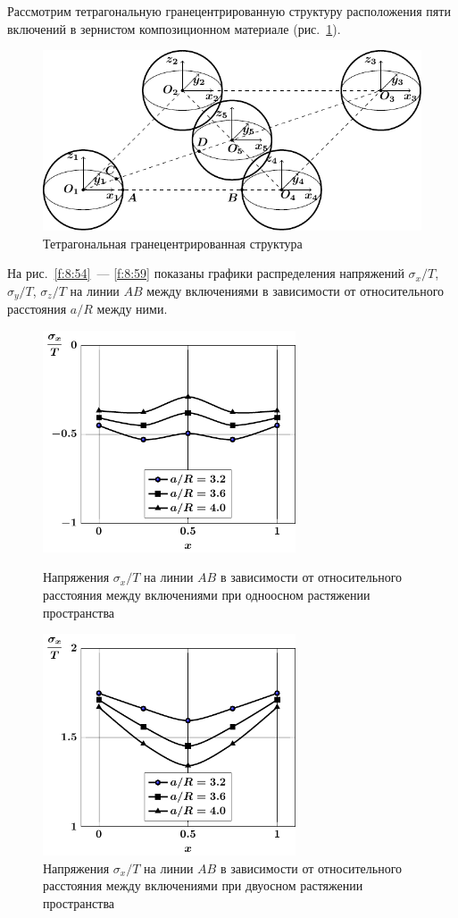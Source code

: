 Рассмотрим тетрагональную гранецентрированную структуру расположения пяти включений в зернистом композиционном материале (рис.~\ref{f:8:53}).

\begin{figure}[h!]
\centering
\includegraphics[width=15cm]{cartesian-spheres-5.pdf}
\caption{Тетрагональная гранецентрированная структура}
\label{f:8:53}
\end{figure}

На рис.~\ref{f:8:54}~--- \ref{f:8:59} показаны графики распределения напряжений $\sigma_x/T$, $\sigma_y/T$, $\sigma_z/T$ на линии $AB$ между включениями в зависимости от относительного расстояния $a/R$ между ними.

\begin{figure}[h!]
\centering\footnotesize
\parbox[b]{7.5cm}{\centering\includegraphics[width=7.5cm]{inc5-a-d95-g25-t1-ab-sig_x.pdf}
\caption{Напряжения $\sigma_x/T$ на линии  $AB$ в зависимости от относительного расстояния между включениями при одноосном растяжении пространства
\label{f:8:54}}}\hfil\hfil
\parbox[b]{7.5cm}{\centering\includegraphics[width=7.5cm]{inc5-a-d95-g25-t2-ab-sig_x.pdf}
\caption{Напряжения $\sigma_x/T$ на линии  $AB$ в зависимости от относительного расстояния между включениями при двуосном растяжении пространства
\label{f:8:55}}}
\end{figure}

